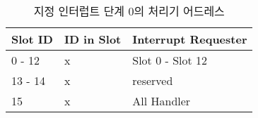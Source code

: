 %
%
\begin{table}[htbp]
\caption{지정 인터럽트 단계 0의 처리기 어드레스}\label{table:ih-ga}
   \begin{center}
   \begin{tabular}{|l|l|l|} \hline
	Slot ID & ID in Slot & Interrupt Requester \\
\hline \hline
	0 - 12   & x & Slot  0 - Slot 12 \\
	13  - 14 & x & reserved \\
	15 & x & All Handler \\
\hline
   \end{tabular}
   \end{center}
\end{table}
%
%
